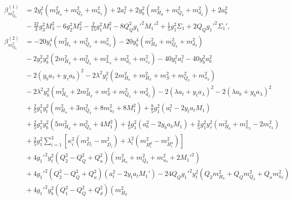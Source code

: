 \documentclass[preprint,amsmath,amssymb,aps,superscriptaddress,prd,
showpacs,floatfix,nofootinbib]{revtex4-1}
\begin{document}
\begin{subequations}
\begin{align}
\beta_{m_{Q_3}^2}^{(1)} &= 2 y_t^2 \left ( m_{H_u}^2 + m_{Q_3}^2 + m_{u_3}^2
\right ) + 2 a_t^2 + 2 y_b^2 \left ( m_{H_d}^2 + m_{Q_3}^2 + m_{d_3}^2
\right ) + 2 a_b^2 \nonumber \\
& {} - \frac{32}{3} g_3^2 M_3^2 - 6 g_2^2 M_2^2 - \frac{2}{15} g_1^2 M_1^2 -
8 Q_Q^2 g_1'^2 M_1'^2 + \frac{1}{5} g_1^2 \Sigma_1 + 2 Q_Q g_1'^2 \Sigma_1' ,
\label{eq:USSMmq222BetaOneLoop} \\
\beta_{m_{Q_3}^2}^{(2)} &= -20 y_t^4 \left ( m_{H_u}^2 + m_{Q_3}^2 + m_{u_3}^2
 \right ) - 20 y_b^4 \left ( m_{H_d}^2 + m_{Q_3}^2 + m_{d_3}^2 \right )
\nonumber \\
& {} - 2 y_\tau^2 y_b^2 \left ( 2 m_{H_d}^2 + m_{Q_3}^2 + m_{L_3}^2 +
m_{d_3}^2 + m_{e_3}^2 \right ) - 40 y_t^2 a_t^2 - 40 y_b^2 a_b^2 \nonumber \\
& {} - 2 \left ( y_b a_\tau + y_\tau a_b \right )^2 - 2 \lambda^2 y_t^2
\left ( 2 m_{H_u}^2 + m_{H_d}^2 + m_S^2 + m_{Q_3}^2 + m_{u_3}^2 \right )
\nonumber \\
& {} - 2 \lambda^2 y_b^2 \left ( m_{H_u}^2 + 2 m_{H_d}^2 + m_S^2 + m_{Q_3}^2
+ m_{d_3}^2 \right ) - 2 \left ( \lambda a_t + y_t a_\lambda \right )^2 -
2 \left ( \lambda a_b + y_b a_\lambda \right )^2 \nonumber \\
& {} + \frac{2}{5} g_1^2 y_t^2 \left ( m_{H_u}^2 + 3m_{Q_3}^2 + 8 m_{u_3}^2
+ 8 M_1^2 \right ) + \frac{8}{5} g_1^2 \left ( a_t^2 - 2 y_t a_t M_1 \right )
\nonumber \\
& {} + \frac{2}{5} g_1^2 y_b^2 \left ( 5 m_{H_d}^2 + m_{Q_3}^2 + 4 M_1^2
\right ) + \frac{4}{5} g_1^2 \left ( a_b^2 - 2 y_b a_b M_1 \right ) +
\frac{2}{5} g_1^2 y_\tau^2 \left ( m_{H_d}^2 + m_{L_3}^2 - 2 m_{e_3}^2
\right ) \nonumber \\
& {} + \frac{2}{5} g_1^2 \sum_{i=1}^3 \left [ \kappa_i^2 \left ( m_{D_i}^2 -
m_{\overline{D}_i}^2 \right ) + \lambda_i^2 \left ( m_{H_i^d}^2 - m_{H_i^u}^2
\right ) \right ] \nonumber \\
& {} + 4 g_1'^2 y_t^2 \left ( Q_2^2 - Q_Q^2 + Q_u^2 \right )
\left ( m_{H_u}^2 + m_{Q_3}^2 + m_{u_3}^2 + 2 M_1'^2 \right ) \nonumber \\
& {} + 4 g_1'^2 \left ( Q_2^2 - Q_Q^2 + Q_u^2 \right ) \left ( a_t^2 -
2 y_t a_t M_1' \right ) - 24 Q_Q g_1'^2 y_t^2 \left ( Q_2 m_{H_u}^2 +
Q_Q m_{Q_3}^2 + Q_um_{u_3}^2 \right ) \nonumber \\
& {} + 4 g_1'^2 y_b^2 \left ( Q_1^2 - Q_Q^2 + Q_d^2 \right ) \left ( m_{H_d}^2

\end{align}
\end{subequations}
\end{document}

